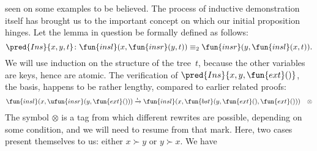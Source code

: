 seen on some examples to be believed. The process of inductive
demonstration itself has brought us to the important concept on which
our initial proposition hinges. Let the lemma in question be formally
defined as follows:
\begin{equation*}
\pred{Ins}{x,y,t} \colon \fun{insl}(x,\fun{insr}(y,t))
\equiv_2 \fun{insr}(y,\fun{insl}(x,t)).
\index{Ins@\predName{Ins}}
\end{equation*}
We will use induction on the structure of the tree~\(t\), because the
other variables are keys, hence are atomic. The verification of
\(\pred{Ins}{x,y,\fun{ext}()}\), the basis, happens to be rather
lengthy, compared to earlier related proofs:
\begin{equation*}
\begin{array}{@{}r@{\;}l@{\;}l@{\quad}r@{}}
  \fun{insl}(x,\ufun{insr}(y,\fun{ext}()))
& \xrightarrow{\smash{\iota}} &
  \fun{insl}(x,\fun{bst}(y,\fun{ext}(),\fun{ext}())) & \otimes
\end{array}
\end{equation*}
The symbol \(\otimes\) is a tag from which different rewrites are
possible, depending on some condition, and we will need to resume from
that mark. Here, two cases present themselves to us: either \(x \succ
y\) or \(y \succ x\). We have
